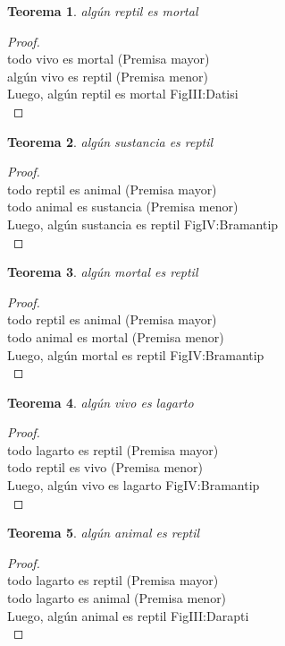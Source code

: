 ﻿\documentclass[12pt]{book}
\newtheorem{theorem}{Teorema}[chapter]
\newtheorem{proof}{Demostración}
\begin{document}
\begin{theorem}
algún reptil es mortal
\label{th: 72}
\end{theorem}\begin{proof}\\todo vivo es mortal	 (Premisa mayor) \\algún vivo es reptil	 (Premisa menor) \\Luego, algún reptil es mortal	FigIII:Datisi \\ \end{proof}
\begin{theorem}
algún sustancia es reptil
\label{th: 73}
\end{theorem}\begin{proof}\\todo reptil es animal	 (Premisa mayor) \\todo animal es sustancia	 (Premisa menor) \\Luego, algún sustancia es reptil	FigIV:Bramantip \\ \end{proof}
\begin{theorem}
algún mortal es reptil
\label{th: 74}
\end{theorem}\begin{proof}\\todo reptil es animal	 (Premisa mayor) \\todo animal es mortal	 (Premisa menor) \\Luego, algún mortal es reptil	FigIV:Bramantip \\ \end{proof}
\begin{theorem}
algún vivo es lagarto
\label{th: 75}
\end{theorem}\begin{proof}\\todo lagarto es reptil	 (Premisa mayor) \\todo reptil es vivo	 (Premisa menor) \\Luego, algún vivo es lagarto	FigIV:Bramantip \\ \end{proof}
\begin{theorem}
algún animal es reptil
\label{th: 76}
\end{theorem}\begin{proof}\\todo lagarto es reptil	 (Premisa mayor) \\todo lagarto es animal	 (Premisa menor) \\Luego, algún animal es reptil	FigIII:Darapti \\ \end{proof}
\end{document}
